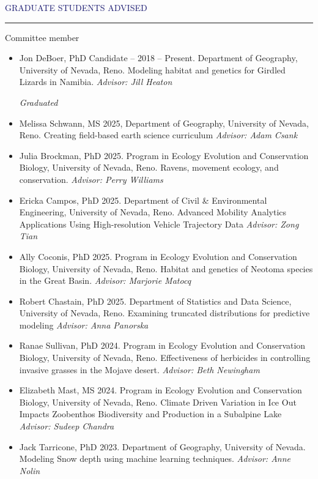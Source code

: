 \documentclass{resume} %
\renewenvironment{rSection}[1]{
\sectionskip
\textcolor{MidnightBlue}{\MakeUppercase{#1}}
\sectionlineskip
\hrule
\begin{list}{}{
\setlength{\leftmargin}{1.5em}
}
\item[]
}{
\end{list}
}
\begin{document}
\begin{rSection}{Graduate Students Advised}
\begin{rSubsection}{Committee member}{}{}{}
\begin{itemize}
  \item[] Jon DeBoer, PhD Candidate – 2018 – Present. Department of Geography, University of Nevada, Reno. Modeling habitat and genetics for Girdled Lizards in Namibia. \textit{Advisor: Jill Heaton}
   
  
  \textit{Graduated}
\item[] Melissa Schwann, MS 2025, Department of Geography, University of Nevada, Reno. Creating field-based earth science curriculum \textit{Advisor: Adam Csank}

\item[] Julia Brockman, PhD 2025. Program in Ecology Evolution and Conservation Biology, University of Nevada, Reno. Ravens, movement ecology, and conservation. \textit{Advisor: Perry Williams}

\item[] Ericka Campos, PhD 2025. Department of Civil & Environmental Engineering, University of Nevada, Reno. Advanced Mobility Analytics Applications Using High-resolution Vehicle Trajectory Data \textit{Advisor: Zong Tian}
   
   \item[] Ally Coconis, PhD 2025. Program in Ecology Evolution and Conservation Biology, University of Nevada, Reno. Habitat and genetics of Neotoma species in the Great Basin. \textit{Advisor: Marjorie Matocq}

  \item[] Robert Chastain, PhD 2025. Department of Statistics and Data Science, University of Nevada, Reno. Examining truncated distributions for predictive modeling \textit{Advisor: Anna Panorska}
  
   \item[] Ranae Sullivan, PhD 2024. Program in Ecology Evolution and Conservation Biology, University of Nevada, Reno. Effectiveness of herbicides in controlling invasive grasses in the Mojave desert. \textit{Advisor: Beth Newingham}

    \item[] Elizabeth Mast, MS 2024. Program in Ecology Evolution and Conservation Biology, University of Nevada, Reno. Climate Driven Variation in Ice Out Impacts Zoobenthos Biodiversity and Production in a Subalpine Lake \textit{Advisor: Sudeep Chandra}
   
   \item[] Jack Tarricone, PhD 2023. Department of Geography, University of Nevada. Modeling Snow depth using machine learning techniques. \textit{Advisor: Anne Nolin}
   

\end{itemize}
\end{rSubsection}
\end{rSection}
\end{document}
